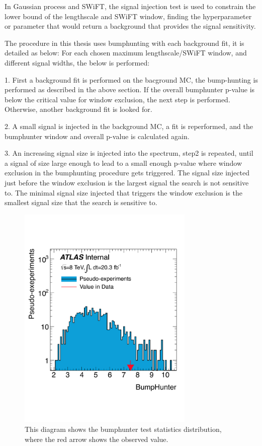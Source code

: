    In Gaussian process and SWiFT, the signal injection test is used to constrain the lower bound of the lengthscale and SWiFT window, finding the hyperparameter or parameter that would return a background that provides the signal sensitivity. 

   The procedure in this thesis uses bumphunting with each background fit, it is detailed as below:
   For each chosen maximum lengthscale/SWiFT window, and different signal widths, the below is performed:

   1. First a background fit is performed on the bacground MC, the bump-hunting is performed as described in the above section. If the overall bumphunter p-value is below the critical value for window exclusion, the next step is performed. Otherwise, another background fit is looked for.

   2. A small signal is injected in the background MC, a fit is reperformed, and the bumphunter window and overall p-value is calculated again. 

   3. An increasing signal size is injected into the spectrum, step2 is repeated, until a signal of size large enough to lead to a small enough p-value where window exclusion in the bumphunting procedure gets triggered. The signal size injected just before the window exclusion is the largest signal the search is not sensitive to. The minimal signal size injected that triggers the window exclusion is the smallest signal size that the search is sensitive to. 

\begin{figure}[!htb]
    \begin{center}
        \includegraphics[width=0.75\textwidth]{figures/chapter_analysismethod/bumphunter}
        \caption{
            This diagram shows the bumphunter test statistics distribution, where the red arrow shows the observed value. 
        }
        \label{fig:swift}
    \end{center}
\end{figure}

